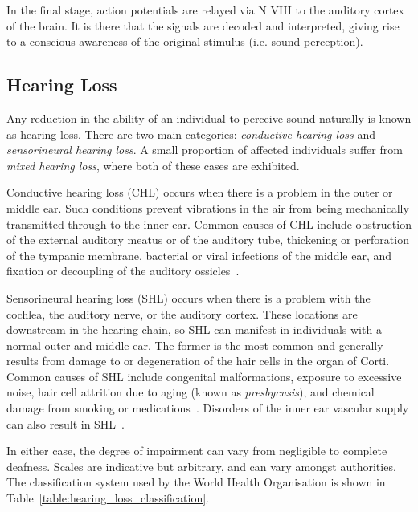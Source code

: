 In the final stage, action potentials are relayed via N VIII to the auditory
cortex of the brain. It is there that the signals are decoded and interpreted,
giving rise to a conscious awareness of the original stimulus (i.e. sound
perception).


\subsection{Hearing Loss}
\label{sect:hearing_loss}

Any reduction in the ability of an individual to perceive sound naturally is
known as hearing loss. There are two main categories: \emph{conductive hearing
loss} and \emph{sensorineural hearing loss}. A small proportion of affected
individuals suffer from \emph{mixed hearing loss}, where both of these cases are
exhibited.

Conductive hearing loss (CHL) occurs when there is a problem in the outer or
middle ear. Such conditions prevent vibrations in the air from being
mechanically transmitted through to the inner ear. Common causes of CHL include
obstruction of the external auditory meatus or of the auditory tube, thickening
or perforation of the tympanic membrane, bacterial or viral infections of the
middle ear, and fixation or decoupling of the auditory
ossicles~\cite{nadol1993,economics2006,flint2010}.

Sensorineural hearing loss (SHL) occurs when there is a problem with the
cochlea, the auditory nerve, or the auditory cortex. These locations are
downstream in the hearing chain, so SHL can manifest in individuals with a
normal outer and middle ear. The former is the most common and generally results
from damage to or degeneration of the hair cells in the organ of Corti. Common
causes of SHL include congenital malformations, exposure to excessive noise,
hair cell attrition due to aging (known as \emph{presbycusis}), and chemical
damage from smoking or medications~\cite{nadol1993,economics2006}. Disorders of
the inner ear vascular supply can also result in SHL~\cite{nadol1993}.

In either case, the degree of impairment can vary from negligible to complete
deafness. Scales are indicative but arbitrary, and can vary amongst authorities.
The classification system used by the World Health Organisation is shown in
Table~\ref{table:hearing_loss_classification}.

